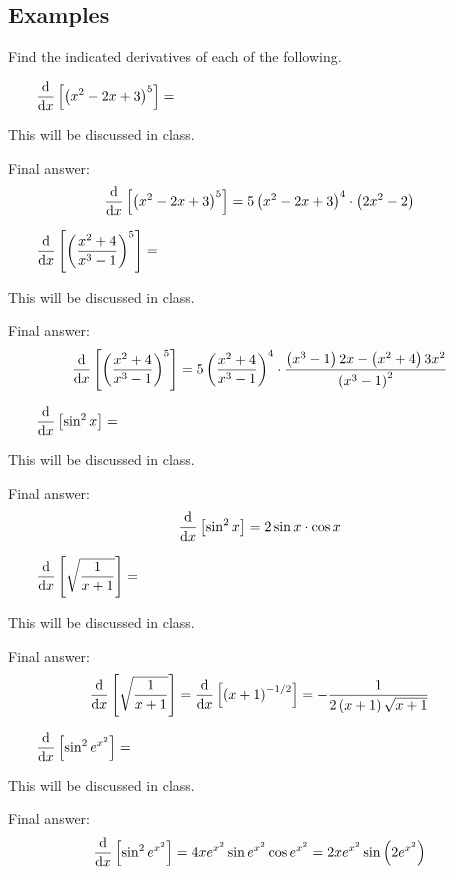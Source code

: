 \documentclass[12pt,addpoints, answers, fleqn]{exam}
\begin{document}
\subsection{Examples}
Find the indicated derivatives of each of the following.
\begin{questions}
\question $\qquad \displaystyle \frac{{\rm{d}}}{{\rm{d}}x}\left[ \left( x^2 - 2x + 3 \right)^5 \right] = $
\begin{solution}
This will be discussed in class.

Final answer:
\[
\frac{{\rm{d}}}{{\rm{d}}x}\left[ \left( x^2 - 2x + 3 \right)^5 \right] =  5 \left( x^2 - 2x + 3 \right)^4 \cdot \left( 2x^2 - 2 \right) 
\]
\end{solution}
\question $\qquad \displaystyle \frac{{\rm{d}}}{{\rm{d}}x}\left[ \left( \frac{x^2 + 4}{x^3-1} \right)^5 \right] = $
\begin{solution}
This will be discussed in class.

Final answer:
\[
\frac{{\rm{d}}}{{\rm{d}}x}\left[ \left( \frac{x^2 + 4}{x^3-1} \right)^5 \right] =  5\left( \frac{x^2 + 4}{x^3-1} \right)^4 \cdot \frac{\left(x^3-1\right) 2x - \left(x^2+4\right)3x^2}{\left(x^3-1\right)^2}
\]
\end{solution}

\question $\qquad \displaystyle \frac{{\rm{d}}}{{\rm{d}}x}\left[ \sin^2 x \right] = $
\begin{solution}
This will be discussed in class.

Final answer:
\[
\frac{{\rm{d}}}{{\rm{d}}x}\left[ \sin^2 x \right] =  2 \sin x \cdot \cos x
\]
\end{solution}


\question $\qquad \displaystyle \frac{{\rm{d}}}{{\rm{d}}x}\left[ \sqrt{\frac{1}{x+1}} \right] = $
\begin{solution}
This will be discussed in class.

Final answer:
\[
\frac{{\rm{d}}}{{\rm{d}}x}\left[ \sqrt{\frac{1}{x+1}} \right] = \frac{{\rm{d}}}{{\rm{d}}x}\left[ \left( x+1\right)^{-1/2} \right] =  -\frac{1}{2\left( x+1\right)\sqrt{x+1}}
\]
\end{solution}
\question $\qquad \displaystyle \frac{{\rm{d}}}{{\rm{d}}x}\left[ \sin^2 e^{x^2} \right] = $
\begin{solution}
This will be discussed in class.

Final answer:
\[
\frac{{\rm{d}}}{{\rm{d}}x}\left[ \sin^2 e^{x^2} \right] = 4x e^{x^2} \sin e^{x^2} \cos e^{x^2}= 2x e^{x^2} \sin \left( 2e^{x^2} \right)
\]



\end{solution}
\end{questions}
\end{document}
